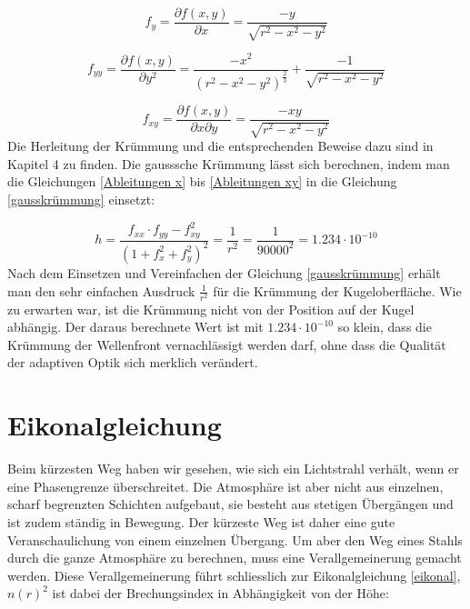 \begin{refsection}
\begin{equation}\label{Ableitungen y}
f_{y} =\dfrac{\partial f(x,y)}{\partial x}= \dfrac{-y}{\sqrt{r^{2}-x^{2}-y^{2}}}
\end{equation}

\begin{equation}\label{Ableitungen yy}
f_{yy}=\dfrac{\partial f(x,y)}{\partial y^{2}}= \dfrac{- x^2}{(r^2 - x^2 - y^2)^{\frac{2}{3}}}+\dfrac{ - 1}{\sqrt{r^2 - x^2 - y^2}}
\end{equation}

\begin{equation}\label{Ableitungen xy}
f_{xy}=\dfrac{\partial f(x,y)}{\partial x \partial y}=  \dfrac{-xy}{\sqrt{r^{2}-x^{2}-y^{2}}}
\end{equation}
Die Herleitung der Krümmung und die entsprechenden Beweise dazu sind in Kapitel 4 zu finden. Die gausssche Krümmung lässt sich berechnen, indem man die Gleichungen \eqref{Ableitungen x} bis \eqref{Ableitungen xy} in die Gleichung \eqref{gausskrümmung} einsetzt:  

\begin{equation}\label{gausskrümmung}
h = \dfrac{f_{xx} \cdot f_{yy} -f_{xy}^{2}}{(1+f_{x}^{2}+f_{y}^{2})^{2}} = \dfrac{1}{r^{2}} =\dfrac{1}{90000^{2}} = 1.234\cdot 10^{-10}
\end{equation}
Nach dem Einsetzen und Vereinfachen der Gleichung \eqref{gausskrümmung} erhält man den sehr einfachen Ausdruck $\frac{1}{r^{2}}$ für die Krümmung der Kugeloberfläche. Wie zu erwarten war, ist die Krümmung nicht von der Position auf der Kugel abhängig. 
Der daraus berechnete Wert ist mit $1.234\cdot 10^{-10}$ so klein, dass die Krümmung der Wellenfront vernachlässigt werden darf, ohne dass die Qualität der adaptiven Optik sich merklich verändert.

\section{Eikonalgleichung}
Beim kürzesten Weg haben wir gesehen, wie sich ein Lichtstrahl verhält, wenn er eine Phasengrenze überschreitet. Die Atmosphäre ist aber nicht aus einzelnen, scharf begrenzten Schichten aufgebaut, sie besteht aus stetigen Übergängen und ist zudem ständig in Bewegung. Der kürzeste Weg ist daher eine gute Veranschaulichung von einem einzelnen Übergang. Um aber den Weg eines Stahls durch die ganze Atmosphäre zu berechnen, muss eine Verallgemeinerung gemacht werden. Diese Verallgemeinerung führt schliesslich zur Eikonalgleichung \eqref{eikonal}, $n(r)^{2}$ ist dabei der Brechungsindex in Abhängigkeit von der Höhe: 


\end{refsection}
